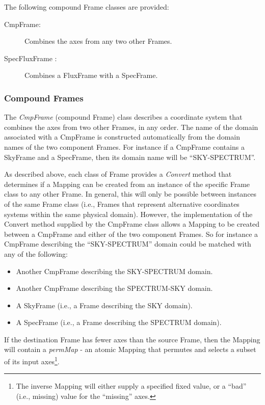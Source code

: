 \documentclass[final,authoryear,5p,times,twocolumn]{elsarticle}
\begin{document}
The following compound Frame classes are provided:

\begin{description}
\item[CmpFrame:] Combines the axes from any two other Frames.
\item[SpecFluxFrame :] Combines a FluxFrame with a SpecFrame.
\end{description}

\subsubsection{Compound Frames}
The \emph{CmpFrame} (compound Frame) class describes a coordinate system
that combines the axes from two other Frames, in any order. The name of
the domain associated with a CmpFrame is constructed automatically from
the domain names of the two component Frames. For instance if a CmpFrame
contains a SkyFrame and a SpecFrame, then its domain name will be
``SKY-SPECTRUM''.

As described above, each class of Frame provides a \emph{Convert} method
that determines if a Mapping can be created from an instance of the specific
Frame class to any other Frame. In general, this will only be possible
between instances of the same Frame class (i.e., Frames that represent
alternative coordinates systems within the same physical domain).
However, the implementation of the Convert method supplied by the
CmpFrame class allows a Mapping to be created between a CmpFrame and
either of the two component Frames. So for instance a CmpFrame describing
the ``SKY-SPECTRUM'' domain could be matched with any of the following:

\begin{itemize}
\item Another CmpFrame describing the SKY-SPECTRUM domain.
\item Another CmpFrame describing the SPECTRUM-SKY domain.
\item A SkyFrame (i.e., a Frame describing the SKY domain).
\item A SpecFrame (i.e., a Frame describing the SPECTRUM domain).
\end{itemize}

If the destination Frame has fewer axes than the source Frame, then the
Mapping will contain a \emph{permMap} - an atomic Mapping that permutes
and selects a subset of its input axes\footnote{The inverse Mapping will
either supply a specified fixed value, or a ``bad'' (i.e., missing) value
for the ``missing'' axes.}.
\end{document}
